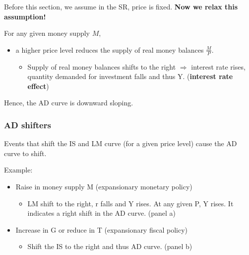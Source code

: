 \documentclass[10pt]{article}
\begin{document}
Before this section, we assume in the SR, price is fixed. 
{\textbf {Now we relax this assumption!}}

For any given money supply $ M $, 
\begin{itemize}
\item a higher price level reduces the supply of real money balances $ \frac{M}{P} $.
		\begin{itemize}
		\item Supply of real money balances shifts to the right $ \Longrightarrow $
				interest rate rises, quantity demanded for investment falls and thus Y.
				({\textbf {interest rate effect}})
		\end{itemize}
\end{itemize}
Hence, the AD curve is downward sloping.

\begin{figure}[H]
\end{figure}






\subsubsection{AD shifters}
Events that shift the IS and LM curve (for a given price level) cause the AD curve to
shift.


Example:
\begin{itemize}
\item Raise in money supply M (expansionary monetary policy)
		\begin{itemize}
		\item LM shift to the right, r falls and Y rises. At any given P, Y rises. 
				It indicates a right shift in the AD curve. (panel a)
		\end{itemize}
\item Increase in G or reduce in T (expansionary fiscal policy)
		\begin{itemize}
		\item Shift the IS to the right and thus AD curve. (panel b)
		\end{itemize}
\end{itemize}
\end{document}

